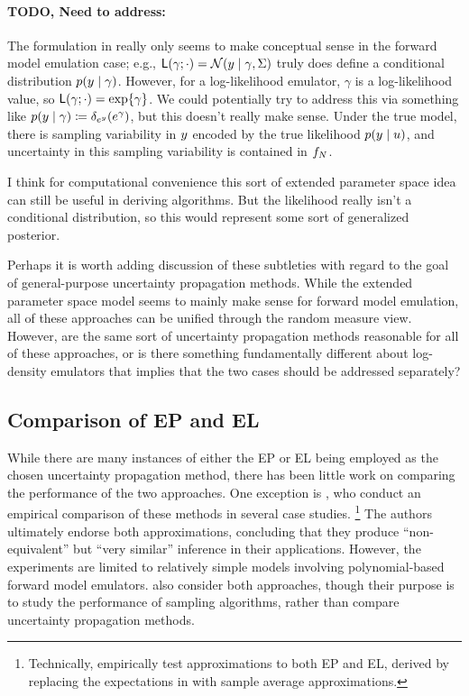 \documentclass[12pt]{article}
\begin{document}
\paragraph{TODO, Need to address: } The formulation in  really only 
seems to make conceptual sense in the forward model emulation case; e.g., 
$\mathsf{L}(\gamma; \cdot) = \mathcal{N}(y \mid \gamma, \Sigma)$ truly does define a conditional 
distribution $p(y \mid \gamma)$. However, for a log-likelihood emulator, $\gamma$ is a log-likelihood
value, so  $\mathsf{L}(\gamma; \cdot) = \exp\mathopen{}\left\{\gamma\right\}\mathclose{}$. We could potentially try to address this via something
like $p(y \mid \gamma) \coloneqq \delta_{e^y}(e^\gamma)$, but this doesn't really make sense.
Under the true model, there is sampling variability in $y$ encoded by the true likelihood 
$p(y \mid u)$, and uncertainty in this sampling variability is contained in $f_{N}$.

I think for computational convenience this sort of extended parameter space idea can still be useful
in deriving algorithms. But the likelihood really isn't a conditional distribution, so this would represent 
some sort of generalized posterior. 

Perhaps it is worth adding discussion of these subtleties with regard to the goal of general-purpose 
uncertainty propagation methods. While the extended parameter space model seems to mainly make
sense for forward model emulation, all of these approaches can be unified through the random measure
view. However, are the same sort of uncertainty propagation methods reasonable for all of these approaches,
or is there something fundamentally different about log-density emulators that implies that the two cases 
should be addressed separately?


\subsection{Comparison of EP and EL}
While there are many instances of either the EP or EL being employed as the chosen uncertainty
propagation method, there has been little work on comparing the performance of the two approaches.
One exception is \citet{BurknerSurrogate}, who conduct an empirical comparison of these methods
in several case studies. 
\footnote{Technically, \citet{BurknerSurrogate} empirically test approximations to both EP and EL, derived
by replacing the expectations in  with sample average approximations.}
The authors ultimately endorse both approximations, concluding that they produce ``non-equivalent''
but ``very similar'' inference in their applications. However, the experiments are limited to relatively simple 
models involving polynomial-based forward model emulators. \citet{garegnani2021NoisyMCMC} also
consider both approaches, though their purpose is to study the performance of sampling algorithms, rather
than compare uncertainty propagation methods.
\end{document}
